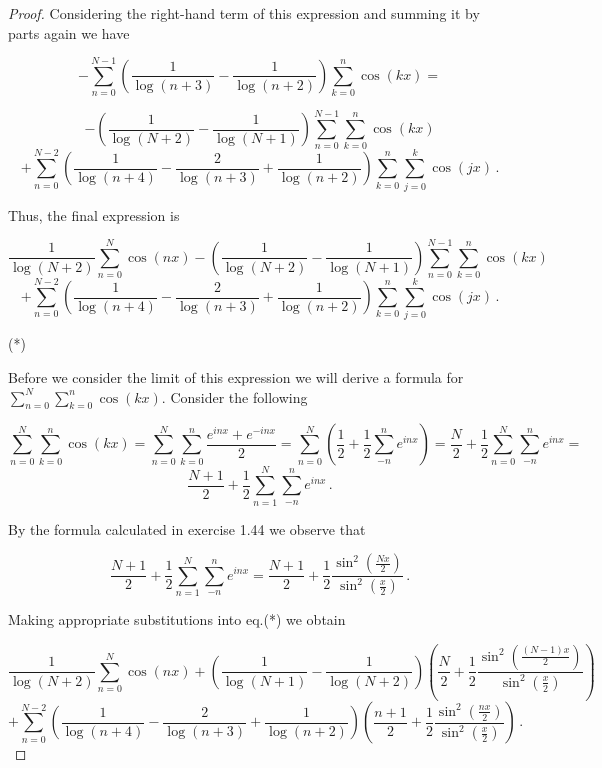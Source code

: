 \documentclass[a4paper]{article}
\numberwithin{equation}{section}
\begin{document}
\begin{description}
\begin{proof}
Considering the right-hand term of this expression and summing it by parts again we have

$$- \sum \limits_{n=0}^{N-1}\left( \frac{1}{\log(n+3)} -\frac{1}{\log(n+2)} \right)\sum \limits_{k=0}^{n}\cos(kx) =$$

$$-\left( \frac{1}{\log(N+2)} -\frac{1}{\log(N+1)} \right)\sum \limits_{n=0}^{N-1}\sum \limits_{k=0}^{n}\cos(kx)$$
$$+ \sum \limits_{n=0}^{N-2}\left( \frac{1}{\log(n+4)} -\frac{2}{\log(n+3)} +\frac{1}{\log(n+2)} \right)\sum \limits_{k=0}^{n}\sum \limits_{j=0}^{k}\cos(jx)\,.$$

Thus, the final expression is

$$\frac{1}{\log(N+2)}\sum \limits_{n=0}^N\cos(nx)-\left( \frac{1}{\log(N+2)} -\frac{1}{\log(N+1)} \right)\sum \limits_{n=0}^{N-1}\sum \limits_{k=0}^{n}\cos(kx)$$
$$+ \sum \limits_{n=0}^{N-2}\left( \frac{1}{\log(n+4)} -\frac{2}{\log(n+3)} +\frac{1}{\log(n+2)} \right)\sum \limits_{k=0}^{n}\sum \limits_{j=0}^{k}\cos(jx)\,.$$\begin{flushright}
(*)
\end{flushright}

Before we consider the limit of this expression we will derive a formula for $\sum_{n=0}^{N}\sum_{k=0}^{n}\cos(kx)$. Consider the following

$$\sum \limits_{n=0}^{N}\sum \limits_{k=0}^{n}\cos(kx) = \sum \limits_{n=0}^{N}\sum \limits_{k=0}^{n}\frac{e^{inx} + e^{-inx}}{2} = \sum \limits_{n=0}^{N}\left(\frac{1}{2}+\frac{1}{2}\sum \limits_{-n}^{n}e^{inx}\right) = \frac{N}{2} + \frac{1}{2}\sum \limits_{n=0}^{N}\sum \limits_{-n}^{n}e^{inx} =$$
$$\frac{N+1}{2} + \frac{1}{2}\sum \limits_{n=1}^{N}\sum \limits_{-n}^{n}e^{inx}\,.$$

By the formula calculated in exercise 1.44 we observe that

$$\frac{N+1}{2} + \frac{1}{2}\sum \limits_{n=1}^{N}\sum \limits_{-n}^{n}e^{inx} = \frac{N+1}{2} + \frac{1}{2}\frac{\sin^2(\frac{Nx}{2})}{\sin^2(\frac{x}{2})}\,.$$

Making appropriate substitutions into eq.(*) we obtain

$$\frac{1}{\log(N+2)}\sum \limits_{n=0}^N\cos(nx)+\left( \frac{1}{\log(N+1)} -\frac{1}{\log(N+2)} \right)\left(\frac{N}{2} + \frac{1}{2}\frac{\sin^2(\frac{(N-1)x}{2})}{\sin^2(\frac{x}{2})}\right)$$
$$+ \sum \limits_{n=0}^{N-2}\left( \frac{1}{\log(n+4)} -\frac{2}{\log(n+3)} +\frac{1}{\log(n+2)} \right)\left(\frac{n+1}{2} + \frac{1}{2}\frac{\sin^2(\frac{nx}{2})}{\sin^2(\frac{x}{2})}\right)\,.$$


\end{proof}
\end{description}
\end{document}
